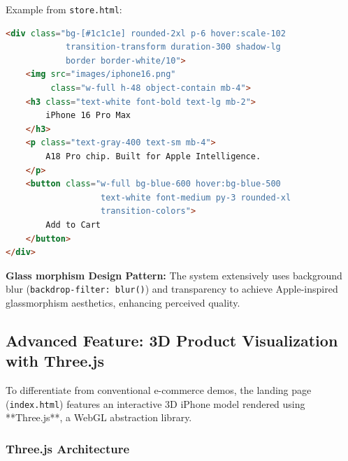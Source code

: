 \documentclass[12pt, a4paper]{report}
\begin{document}
Example from \texttt{store.html}:

\begin{lstlisting}[language=HTML, caption=Tailwind CSS Utility Classes for Product Card]
<div class="bg-[#1c1c1e] rounded-2xl p-6 hover:scale-102 
            transition-transform duration-300 shadow-lg 
            border border-white/10">
    <img src="images/iphone16.png" 
         class="w-full h-48 object-contain mb-4">
    <h3 class="text-white font-bold text-lg mb-2">
        iPhone 16 Pro Max
    </h3>
    <p class="text-gray-400 text-sm mb-4">
        A18 Pro chip. Built for Apple Intelligence.
    </p>
    <button class="w-full bg-blue-600 hover:bg-blue-500 
                   text-white font-medium py-3 rounded-xl 
                   transition-colors">
        Add to Cart
    </button>
</div>
\end{lstlisting}

\textbf{Glass morphism Design Pattern:} The system extensively uses background blur (\texttt{backdrop-filter: blur()}) and transparency to achieve Apple-inspired glassmorphism aesthetics, enhancing perceived quality.

\subsection{Advanced Feature: 3D Product Visualization with Three.js}

To differentiate from conventional e-commerce demos, the landing page (\texttt{index.html}) features an interactive 3D iPhone model rendered using **Three.js**, a WebGL abstraction library.

\subsubsection{Three.js Architecture}
\end{document}
